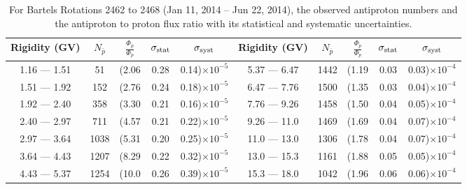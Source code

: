 \begin{table}[p] 
\renewcommand\baselinestretch{1.3}\selectfont
\setlength\tabcolsep{3pt}
\centering
\begin{tabular}{ccccc | ccccc}
\hline
\textbf{Rigidity}  (GV)  & $N_{\bar{p}}$ & $\frac{\Phi_{\bar{p}}}{\Phi_{p}}$ & $\sigma_{\rm{stat}}$ & $\sigma_{\rm{syst}}$ \hspace{1cm}   & \textbf{Rigidity}  (GV)  & $N_{\bar{p}}$ & $\frac{\Phi_{\bar{p}}}{\Phi_{p}}$ & $\sigma_{\rm{stat}}$ & $\sigma_{\rm{syst}}$ \hspace{1cm} \\ 
\hline
1.16 — 1.51   &  51                  &(2.06                          &  0.28              &      0.14)$\times 10^{-5}$  & 5.37 — 6.47                &  1442                    &(1.19                                &  0.03                   &      0.03)$\times 10^{-4}$\\
1.51 — 1.92   &  152                &(2.76                          &  0.24              &      0.18)$\times 10^{-5}$  & 6.47 — 7.76                &  1500                    &(1.35                                &  0.03                   &      0.04)$\times 10^{-4}$\\
1.92 — 2.40   &  358                &(3.30                          &  0.21              &      0.16)$\times 10^{-5}$  & 7.76 — 9.26                &  1458                    &(1.50                                &  0.04                   &      0.05)$\times 10^{-4}$\\    
2.40 — 2.97   &  711                &(4.57                          &  0.21              &      0.22)$\times 10^{-5}$  & 9.26 — 11.0                &  1469                    &(1.69                                &  0.04                   &      0.07)$\times 10^{-4}$\\    
2.97 — 3.64   &  1038              &(5.31                          &  0.20              &      0.25)$\times 10^{-5}$  & 11.0 — 13.0                 &  1306                    &(1.78                                &  0.04                   &      0.07)$\times 10^{-4}$\\
3.64 — 4.43   &  1207              &(8.29                          &  0.22              &      0.32)$\times 10^{-5}$  & 13.0 — 15.3               &  1161                    &(1.88                                &  0.05                   &      0.05)$\times 10^{-4}$\\
4.43 — 5.37   &  1254              &(10.0                          &  0.26              &      0.39)$\times 10^{-5}$  & 15.3 — 18.0               &  1042                    &(1.96                                &  0.06                   &      0.06)$\times 10^{-4}$\\
\hline
\end{tabular}
\caption[Antiproton to proton flux ratio for Bartels Rotations 2462 to 2468]{For Bartels Rotations 2462 to 2468 (Jan 11, 2014 – Jun 22, 2014), the observed antiproton numbers and the antiproton to proton flux ratio with its statistical and systematic uncertainties.}
\label{TableOfDependent7}
\end{table}

